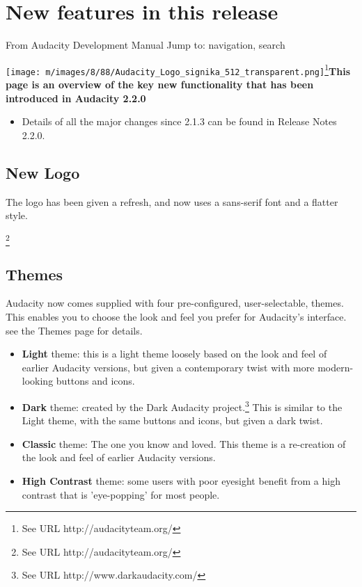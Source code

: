 
																					
\chapter{New features in this release}

\label{f0}													From Audacity Development Manual
															Jump to: navigation, search
					
\texttt{[image: m/images/8/88/Audacity\_Logo\_signika\_512\_transparent.png]}\footnote{See URL http://audacityteam.org/}\newline\textbf{This page is an overview of the key new functionality that has been introduced in Audacity 2.2.0}
\begin{itemize}
\item  Details of all the major changes since 2.1.3 can be found in Release Notes 2.2.0.
\end{itemize}

\section{New Logo}


The logo has been given a refresh, and now uses a sans-serif font and a flatter style.

\footnote{See URL http://audacityteam.org/}
\section{Themes}


Audacity now comes supplied with four pre-configured, user-selectable, themes.  This enables you to choose the look and feel you prefer for Audacity's interface. see the Themes page for details.
\begin{itemize}
\item \textbf{Light} theme: this is a light theme loosely based on the look and feel of earlier Audacity versions, but given a contemporary twist with more modern-looking buttons and icons. 
\item \textbf{Dark} theme: created by the Dark Audacity project.\footnote{See URL http://www.darkaudacity.com/} This is similar to the Light theme, with the same buttons and icons, but given a dark twist.
\item \textbf{Classic} theme: The one you know and loved. This theme is a re-creation of the look and feel of earlier Audacity versions. 
\item \textbf{High Contrast} theme: some users with poor eyesight benefit from a high contrast that is 'eye-popping' for most people.
\end{itemize}

